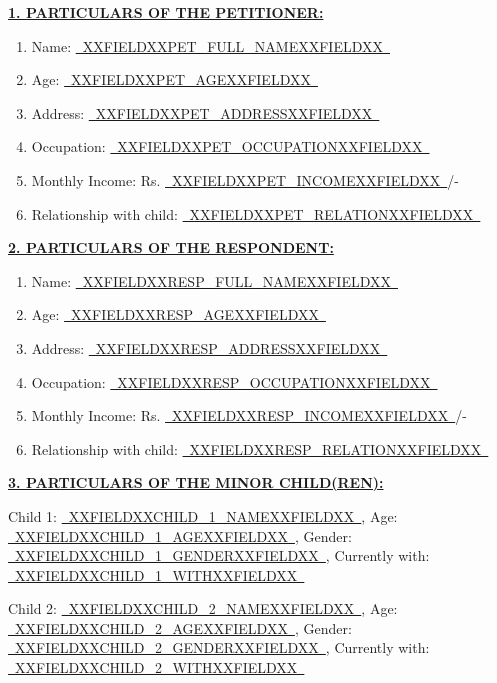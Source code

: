 \documentclass[12pt,a4paper]{article}
\newcommand{\fillline}[1]{\underline{~#1~}}
\begin{document}
\noindent\textbf{\uline{1. PARTICULARS OF THE PETITIONER:}}
\begin{enumerate}[label=(\alph*), itemsep=0.4em]
    \item Name: \fillline{XXFIELDXXPET_FULL_NAMEXXFIELDXX}
    \item Age: \fillline{XXFIELDXXPET_AGEXXFIELDXX}
    \item Address: \fillline{XXFIELDXXPET_ADDRESSXXFIELDXX}
    \item Occupation: \fillline{XXFIELDXXPET_OCCUPATIONXXFIELDXX}
    \item Monthly Income: Rs. \fillline{XXFIELDXXPET_INCOMEXXFIELDXX}/-
    \item Relationship with child: \fillline{XXFIELDXXPET_RELATIONXXFIELDXX}
\end{enumerate}

\vspace{1em}

\noindent\textbf{\uline{2. PARTICULARS OF THE RESPONDENT:}}
\begin{enumerate}[label=(\alph*), itemsep=0.4em]
    \item Name: \fillline{XXFIELDXXRESP_FULL_NAMEXXFIELDXX}
    \item Age: \fillline{XXFIELDXXRESP_AGEXXFIELDXX}
    \item Address: \fillline{XXFIELDXXRESP_ADDRESSXXFIELDXX}
    \item Occupation: \fillline{XXFIELDXXRESP_OCCUPATIONXXFIELDXX}
    \item Monthly Income: Rs. \fillline{XXFIELDXXRESP_INCOMEXXFIELDXX}/-
    \item Relationship with child: \fillline{XXFIELDXXRESP_RELATIONXXFIELDXX}
\end{enumerate}

\vspace{1em}

\noindent\textbf{\uline{3. PARTICULARS OF THE MINOR CHILD(REN):}}

\vspace{0.5em}
\noindent Child 1: \fillline{XXFIELDXXCHILD_1_NAMEXXFIELDXX}, Age: \fillline{XXFIELDXXCHILD_1_AGEXXFIELDXX}, Gender: \fillline{XXFIELDXXCHILD_1_GENDERXXFIELDXX}, Currently with: \fillline{XXFIELDXXCHILD_1_WITHXXFIELDXX}

\noindent Child 2: \fillline{XXFIELDXXCHILD_2_NAMEXXFIELDXX}, Age: \fillline{XXFIELDXXCHILD_2_AGEXXFIELDXX}, Gender: \fillline{XXFIELDXXCHILD_2_GENDERXXFIELDXX}, Currently with: \fillline{XXFIELDXXCHILD_2_WITHXXFIELDXX}
\end{document}

